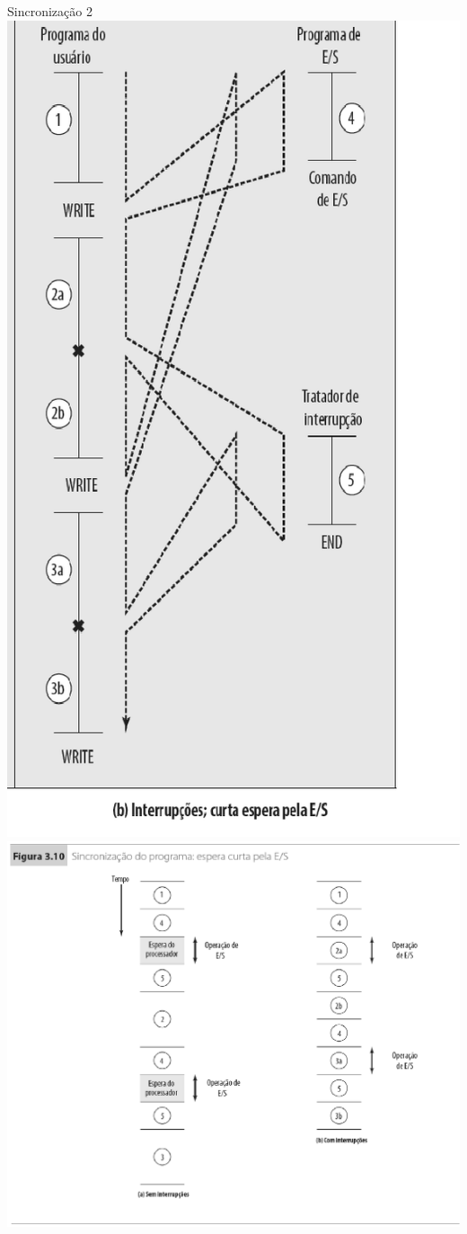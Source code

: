 \begin{slide}{Sincronização 2}
   \centering
   \includegraphics[height=0.8\textheight]{figs/int02.eps}
   \includegraphics[height=0.8\textheight]{figs/sinc1.eps}

\end{slide}
